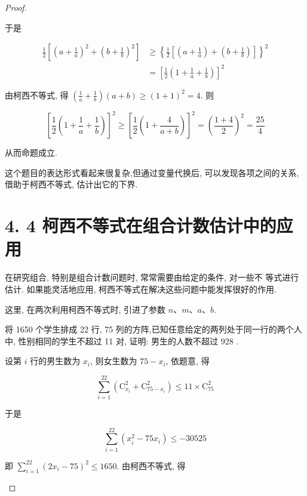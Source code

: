 \begin{proof}
\begin{example}
\begin{solution}
\begin{note}
\begin{solution}
	于是
	
	$$
	\begin{aligned}
	\frac{1}{2}\left[\left(a+\frac{1}{a}\right)^{2}+\left(b+\frac{1}{b}\right)^{2}\right] & \geqslant\left\{\frac{1}{2}\left[\left(a+\frac{1}{a}\right)+\left(b+\frac{1}{b}\right)\right]\right\}^{2} \\
	& =\left[\frac{1}{2}\left(1+\frac{1}{a}+\frac{1}{b}\right)\right]^{2}
	\end{aligned}
	$$
	
	由柯西不等式, 得 $\left(\frac{1}{a}+\frac{1}{b}\right)(a+b) \geqslant(1+1)^{2}=4$. 则
	
	$$
	\left[\frac{1}{2}\left(1+\frac{1}{a}+\frac{1}{b}\right)\right]^{2} \geqslant\left[\frac{1}{2}\left(1+\frac{4}{a+b}\right)\right]^{2}=\left(\frac{1+4}{2}\right)^{2}=\frac{25}{4}
	$$
	
	从而命题成立.
\end{solution}

	这个题目的表达形式看起来很复杂,但通过变量代换后, 可以发现各项之间的关系,借助于柯西不等式, 估计出它的下界.


	\section*{4. 4 柯西不等式在组合计数估计中的应用}
	在研究组合, 特别是组合计数问题时, 常常需要由给定的条件, 对一些不	等式进行估计. 如果能灵活地应用, 柯西不等式在解决这些问题中能发挥很好的作用.

\begin{note}
	这里, 在两次利用柯西不等式时, 引进了参数 $n 、 m 、 a 、 b$.
\end{note}

\begin{example}
	将 1650 个学生排成 22 行, 75 列的方阵,已知任意给定的两列处于同一行的两个人中, 性别相同的学生不超过 11 对, 证明: 男生的人数不超过 928 .
\end{example}
\begin{solution}
	设第 $i$ 行的男生数为 $x_{i}$, 则女生数为 $75-x_{i}$, 依题意, 得
	
	$$
	\sum_{i=1}^{22}\left(\mathrm{C}_{x_{i}}^{2}+\mathrm{C}_{75-x_{i}}^{2}\right) \leqslant 11 \times \mathrm{C}_{75}^{2}
	$$
	
	于是
	
	$$
	\sum_{i=1}^{22}\left(x_{i}^{2}-75 x_{i}\right) \leqslant-30525
	$$
	
	即 $\sum_{i=1}^{22}\left(2 x_{i}-75\right)^{2} \leqslant 1650$. 由柯西不等式, 得
	

\end{solution}
\end{note}
\end{solution}
\end{example}
\end{proof}
